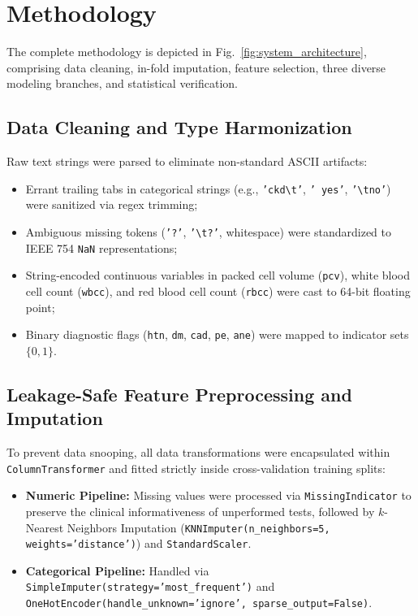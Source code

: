 \documentclass[conference]{IEEEtran}
\begin{document}
\section{Methodology}

The complete methodology is depicted in Fig.~\ref{fig:system_architecture}, comprising data cleaning, in-fold imputation, feature selection, three diverse modeling branches, and statistical verification.

\subsection{Data Cleaning and Type Harmonization}
Raw text strings were parsed to eliminate non-standard ASCII artifacts:
\begin{itemize}
    \item Errant trailing tabs in categorical strings (e.g., \texttt{'ckd\textbackslash t'}, \texttt{' yes'}, \texttt{'\textbackslash tno'}) were sanitized via regex trimming;
    \item Ambiguous missing tokens (\texttt{'?'}, \texttt{'\textbackslash t?'}, whitespace) were standardized to IEEE 754 \texttt{NaN} representations;
    \item String-encoded continuous variables in packed cell volume (\texttt{pcv}), white blood cell count (\texttt{wbcc}), and red blood cell count (\texttt{rbcc}) were cast to 64-bit floating point;
    \item Binary diagnostic flags (\texttt{htn}, \texttt{dm}, \texttt{cad}, \texttt{pe}, \texttt{ane}) were mapped to indicator sets $\{0, 1\}$.
\end{itemize}

\subsection{Leakage-Safe Feature Preprocessing and Imputation}
To prevent data snooping, all data transformations were encapsulated within \texttt{ColumnTransformer} and fitted strictly inside cross-validation training splits:
\begin{itemize}
    \item \textbf{Numeric Pipeline:} Missing values were processed via \texttt{MissingIndicator} to preserve the clinical informativeness of unperformed tests, followed by $k$-Nearest Neighbors Imputation (\texttt{KNNImputer(n\_neighbors=5, weights='distance')}) and \texttt{StandardScaler}.
    \item \textbf{Categorical Pipeline:} Handled via \texttt{SimpleImputer(strategy='most\_frequent')} and \texttt{OneHotEncoder(handle\_unknown='ignore', sparse\_output=False)}.
\end{itemize}
\end{document}
